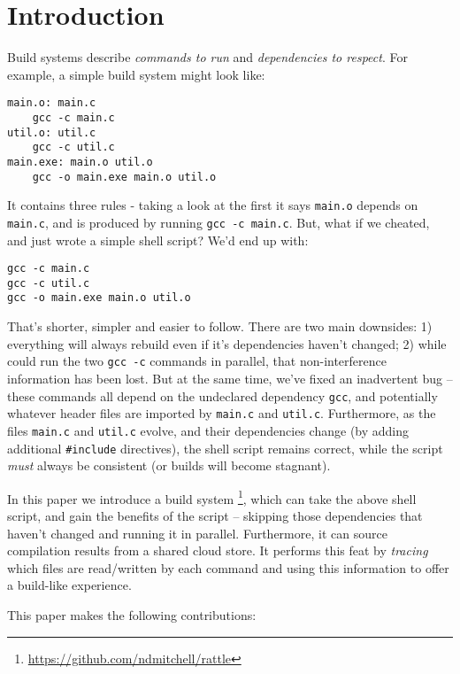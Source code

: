 \section{Introduction}
\label{sec:introduction}

Build systems \citep{build_systems_a_la_carte} describe \emph{commands to run} and \emph{dependencies to respect}. For example, a simple \Make build system might look like:

\begin{verbatim}
main.o: main.c
    gcc -c main.c
util.o: util.c
    gcc -c util.c
main.exe: main.o util.o
    gcc -o main.exe main.o util.o
\end{verbatim}

It contains three rules - taking a look at the first it says \texttt{main.o} depends on \texttt{main.c}, and is produced by running \texttt{gcc -c main.c}. But, what if we cheated, and just wrote a simple shell script? We'd end up with:

\begin{verbatim}
gcc -c main.c
gcc -c util.c
gcc -o main.exe main.o util.o
\end{verbatim}

That's shorter, simpler and easier to follow. There are two main downsides: 1) everything will always rebuild even if it's dependencies haven't changed; 2) while \Make could run the two \texttt{gcc -c} commands in parallel, that non-interference information has been lost. But at the same time, we've fixed an inadvertent bug -- these commands all depend on the undeclared dependency \texttt{gcc}, and potentially whatever header files are imported by \texttt{main.c} and \texttt{util.c}. Furthermore, as the files \texttt{main.c} and \texttt{util.c} evolve, and their dependencies change (by adding additional \texttt{\#include} directives), the shell script remains correct, while the \Make script \emph{must} always be consistent (or builds will become stagnant).

In this paper we introduce a build system \Rattle\footnote{\url{https://github.com/ndmitchell/rattle}}, which can take the above shell script, and gain the benefits of the \Make script -- skipping those dependencies that haven't changed and running it in parallel. Furthermore, it can source compilation results from a shared cloud store. It performs this feat by \emph{tracing} which files are read/written by each command and using this information to offer a build-like experience.

This paper makes the following contributions:

